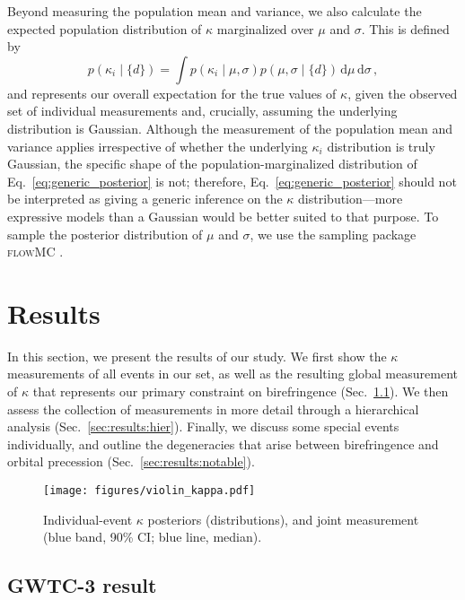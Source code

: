 \documentclass[aps,prd,twocolumn,superscriptaddress,preprintnumbers,nofootinbib]{revtex4-2}
\newcommand{\infd}{\mathrm{d}}
\begin{document}
Beyond measuring the population mean and variance, we also calculate the expected population distribution of $\kappa$ marginalized over $\mu$ and $\sigma$.
This is defined by
\begin{equation}
p(\kappa_i \mid \{d\})=\int p(\kappa_i \mid \mu,\sigma)p(\mu,\sigma\mid \{d\})\,\infd\mu\,\infd\sigma\, , 
    \label{eq:generic_posterior}
\end{equation}
and represents our overall expectation for the true values of $\kappa$, given the observed set of individual measurements and, crucially, assuming the underlying distribution is Gaussian.
Although the measurement of the population mean and variance applies irrespective of whether the underlying $\kappa_i$ distribution is truly Gaussian, the specific shape of the population-marginalized distribution of Eq.~\eqref{eq:generic_posterior} is not; therefore, Eq.~\eqref{eq:generic_posterior} should not be interpreted as giving a generic inference on the $\kappa$ distribution---more expressive models than a Gaussian would be better suited to that purpose. 
To sample the posterior distribution of $\mu$ and $\sigma$, we use the sampling package \textsc{flowMC} \citep{flowMC}.

\section{Results}
\label{sec:Results}

In this section, we present the results of our study.
We first show the $\kappa$ measurements of all events in our set, as well as the resulting global measurement of $\kappa$ that represents our primary constraint on birefringence (Sec.~\ref{sec:results:gwtc}).
We then assess the collection of measurements in more detail through a hierarchical analysis (Sec.~\ref{sec:results:hier}).
Finally, we discuss some special events individually, and outline the degeneracies that arise between birefringence and orbital precession (Sec.~\ref{sec:results:notable}).

\begin{figure}
    \texttt{[image: figures/violin\_kappa.pdf]}
    \caption{
        Individual-event $\kappa$ posteriors (distributions), and joint measurement (blue band, 90\% CI; blue line, median).
    }
    \label{fig:violin_kappa}
\end{figure}

\subsection{GWTC-3 result}
\label{sec:results:gwtc}
\end{document}
